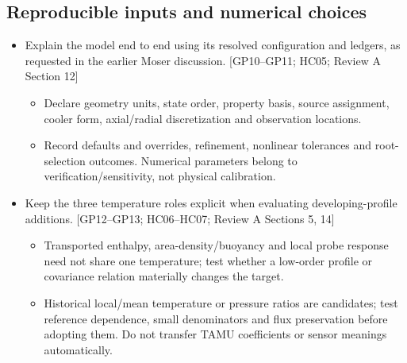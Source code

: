 \subsection{Reproducible inputs and numerical choices}
\begin{itemize}[leftmargin=*]
\item Explain the model end to end using its resolved configuration and ledgers, as requested in the earlier Moser discussion. [GP10--GP11; HC05; Review A Section 12]
\begin{itemize}
\item Declare geometry units, state order, property basis, source assignment, cooler form, axial/radial discretization and observation locations.
\item Record defaults and overrides, refinement, nonlinear tolerances and root-selection outcomes. Numerical parameters belong to verification/sensitivity, not physical calibration.
\end{itemize}
\item Keep the three temperature roles explicit when evaluating developing-profile additions. [GP12--GP13; HC06--HC07; Review A Sections 5, 14]
\begin{itemize}
\item Transported enthalpy, area-density/buoyancy and local probe response need not share one temperature; test whether a low-order profile or covariance relation materially changes the target.
\item Historical local/mean temperature or pressure ratios are candidates; test reference dependence, small denominators and flux preservation before adopting them. Do not transfer TAMU coefficients or sensor meanings automatically.
\end{itemize}
\end{itemize}
